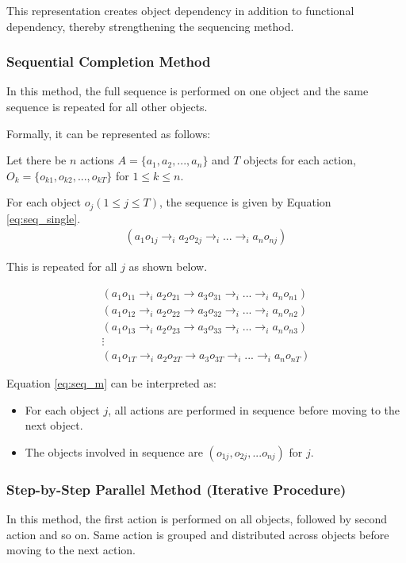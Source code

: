 \documentclass[a4paper,11pt]{lmcs}
\begin{document}
This representation creates object dependency in addition to functional dependency, thereby strengthening the sequencing method.

\subsubsection{Sequential Completion Method}
In this method, the full sequence is performed on one object and the same sequence is repeated for all other objects.

Formally, it can be represented as follows:

Let there be $n$ actions $A = \{a_1,a_2,...,a_n\}$ and $T$ objects for each action, $O_k = \{o_{k1},o_{k2},...,o_{kT}\}$ for $1\leq k \leq n$.

For each object $o_j (1 \leq j \leq T)$, the sequence is given by Equation \ref{eq:seq_single}.
\begin{eqnarray}
 \label{eq:seq_single}
 (a_1o_{1j} \rightarrow_i a_2o_{2j} \rightarrow_i... \rightarrow_i a_no_{nj})
\end{eqnarray}

This is repeated for all $j$ as shown below.

\begin{eqnarray}
\label{eq:seq_m}
(a_{1} o_{11} \rightarrow_i a_2 o_{21} \rightarrow a_3 o_{31} \rightarrow_i ... \rightarrow_i a_n o_{n1}) \\
(a_{1} o_{12} \rightarrow_i a_2 o_{22} \rightarrow a_3 o_{32} \rightarrow_i ... \rightarrow_i a_n o_{n2}) \nonumber \\
(a_{1} o_{13} \rightarrow_i a_2 o_{23} \rightarrow a_3 o_{33} \rightarrow_i ... \rightarrow_i a_n o_{n3}) \nonumber \\
\vdots \nonumber \\
(a_{1} o_{1T} \rightarrow_i a_2 o_{2T} \rightarrow a_3 o_{3T} \rightarrow_i ... \rightarrow_i a_n o_{nT}) \nonumber
\end{eqnarray}

Equation \ref{eq:seq_m} can be interpreted as:
\begin{itemize}
 \item For each object $j$, all actions are performed in sequence before moving to the next object.
 \item The objects involved in sequence are $(o_{1j},o_{2j},...o_{nj})$ for $j$.
\end{itemize}

\subsubsection{Step-by-Step Parallel Method (Iterative Procedure)}
In this method, the first action is performed on all objects, followed by second action and so on. Same action is grouped and distributed across objects before moving to the next action.
\end{document}
